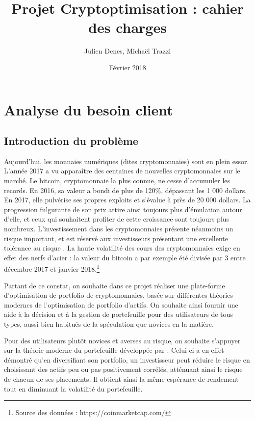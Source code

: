 \documentclass[a4paper]{article}
\title{Projet Cryptoptimisation : cahier des charges}
\author[]{Julien Denes, Michaël Trazzi}
\affil[]{Faculté des Sciences et Ingénierie -- Sorbonne Université}
\date{Février 2018}
\begin{document}
\maketitle

\section{Analyse du besoin client}

\subsection{Introduction du problème}

Aujourd’hui, les monnaies numériques (dites cryptomonnaies) sont en plein essor. L'année 2017 a vu apparaître des centaines de nouvelles cryptomonnaies sur le marché. Le bitcoin, cryptomonnaie la plus connue, ne cesse d’accumuler les records. En 2016, sa valeur a bondi de plus de 120\%, dépassant les 1 000 dollars. En 2017, elle pulvérise ses propres exploits et s'évalue à près de 20 000 dollars. La progression fulgurante de son prix attire ainsi toujours plus d'émulation autour d'elle, et ceux qui souhaitent profiter de cette croissance sont toujours plus nombreux. L’investissement dans les cryptomonnaies présente néanmoins un risque important, et est réservé aux investisseurs présentant une excellente tolérance au risque \cite{Elendner2018}. La haute volatilité des cours des cryptomonnaies exige en effet des nerfs d’acier : la valeur du bitcoin a par exemple été divisée par 3 entre décembre 2017 et janvier 2018.\footnote{Source des données : https://coinmarketcap.com/}

Partant de ce constat, on souhaite dans ce projet réaliser une plate-forme d’optimisation de portfolio de cryptomonnaies, basée sur différentes théories modernes de l'optimisation de portfolio d'actifs. On souhaite ainsi fournir une aide à la décision et à la gestion de portefeuille pour des utilisateurs de tous types, aussi bien habitués de la spéculation que novices en la matière.

Pour des utilisateurs plutôt novices et averses au risque, on souhaite s'appuyer sur la théorie moderne du portefeuille développée par \citet{Markovitz1952}. Celui-ci a en effet démontré qu'en diversifiant son portfolio, un investisseur peut réduire le risque en choisissant des actifs peu ou pas positivement corrélés, atténuant ainsi le risque de chacun de ses placements. Il obtient ainsi la même espérance de rendement tout en diminuant la volatilité du portefeuille.
\end{document}
